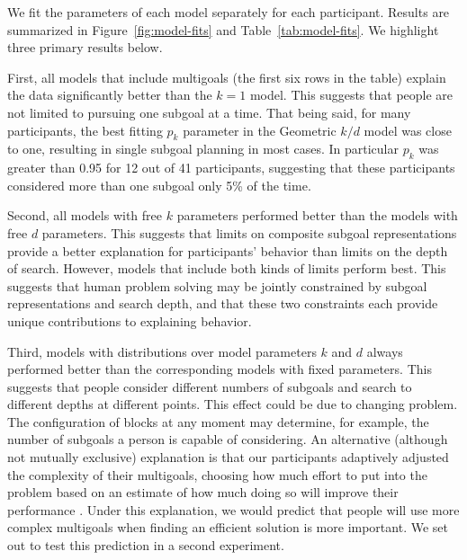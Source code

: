 \documentclass[10pt,letterpaper]{article}
\begin{document}
We fit the parameters of each model separately for each participant. Results are summarized in Figure~\ref{fig:model-fits} and Table~\ref{tab:model-fits}. We highlight three primary results below.

First, all models that include multigoals (the first six rows in the table) explain the data significantly better than the $k=1$ model. This suggests that people are not limited to pursuing one subgoal at a time. That being said, for many participants, the best fitting $p_k$ parameter in the Geometric $k/d$ model was close to one, resulting in single subgoal planning in most cases. In particular $p_k$ was greater than 0.95 for 12 out of 41 participants, suggesting that these participants considered more than one subgoal only 5\% of the time.


Second, all models with free $k$ parameters performed better than the models with free $d$ parameters. This suggests that limits on composite subgoal representations provide a better explanation for participants' behavior than limits on the depth of search. However, models that include both kinds of limits perform best. This suggests that human problem solving may be jointly constrained by subgoal representations and search depth, and that these two constraints each provide unique contributions to explaining behavior.

Third, models with distributions over model parameters $k$ and $d$ always performed better than the corresponding models with fixed parameters. This suggests that people consider different numbers of subgoals and search to different depths at different points. This effect could be due to changing problem. The configuration of blocks at any moment may determine, for example, the number of subgoals a person is capable of considering. An alternative (although not mutually exclusive) explanation is that our participants adaptively adjusted the complexity of their multigoals, choosing how much effort to put into the problem based on an estimate of how much doing so will improve their performance \citep{Shenhav2017,lieder2017strategy}.
Under this explanation, we would predict that people will use more complex multigoals when finding an efficient solution is more important. We set out to test this prediction in a second experiment.
\end{document}

